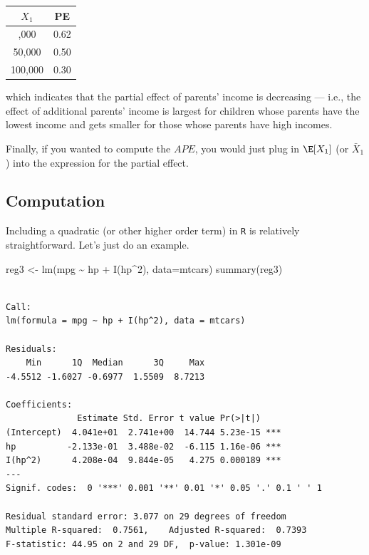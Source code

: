 \documentclass[
  letterpaper,
  DIV=11,
  numbers=noendperiod]{scrreprt}
\newenvironment{Shaded}{\begin{snugshade}}{\end{snugshade}}
\newcommand{\AttributeTok}[1]{\textcolor[rgb]{0.40,0.45,0.13}{#1}}
\newcommand{\DecValTok}[1]{\textcolor[rgb]{0.68,0.00,0.00}{#1}}
\newcommand{\FunctionTok}[1]{\textcolor[rgb]{0.28,0.35,0.67}{#1}}
\newcommand{\NormalTok}[1]{\textcolor[rgb]{0.00,0.23,0.31}{#1}}
\newcommand{\OtherTok}[1]{\textcolor[rgb]{0.00,0.23,0.31}{#1}}
\newcommand{\SpecialCharTok}[1]{\textcolor[rgb]{0.37,0.37,0.37}{#1}}
\begin{document}
\begin{longtable}[]{@{}cc@{}}
\toprule\noalign{}
\(X_1\) & PE \\
\midrule\noalign{}
\endhead
\bottomrule\noalign{}
\endlastfoot
20,000 & 0.62 \\
50,000 & 0.50 \\
100,000 & 0.30 \\
\end{longtable}

which indicates that the partial effect of parents' income is decreasing
--- i.e., the effect of additional parents' income is largest for
children whose parents have the lowest income and gets smaller for those
whose parents have high incomes.

Finally, if you wanted to compute the \(APE\), you would just plug in
\(\E[X_1]\) (or \(\bar{X}_1\)) into the expression for the partial
effect.

\subsection{Computation}\label{computation-3}

Including a quadratic (or other higher order term) in \texttt{R} is
relatively straightforward. Let's just do an example.

\begin{Shaded}
\begin{Highlighting}[]
\NormalTok{reg3 }\OtherTok{\textless{}{-}} \FunctionTok{lm}\NormalTok{(mpg }\SpecialCharTok{\textasciitilde{}}\NormalTok{ hp }\SpecialCharTok{+} \FunctionTok{I}\NormalTok{(hp}\SpecialCharTok{\^{}}\DecValTok{2}\NormalTok{), }\AttributeTok{data=}\NormalTok{mtcars)}
\FunctionTok{summary}\NormalTok{(reg3)}
\end{Highlighting}
\end{Shaded}

\begin{verbatim}

Call:
lm(formula = mpg ~ hp + I(hp^2), data = mtcars)

Residuals:
    Min      1Q  Median      3Q     Max 
-4.5512 -1.6027 -0.6977  1.5509  8.7213 

Coefficients:
              Estimate Std. Error t value Pr(>|t|)    
(Intercept)  4.041e+01  2.741e+00  14.744 5.23e-15 ***
hp          -2.133e-01  3.488e-02  -6.115 1.16e-06 ***
I(hp^2)      4.208e-04  9.844e-05   4.275 0.000189 ***
---
Signif. codes:  0 '***' 0.001 '**' 0.01 '*' 0.05 '.' 0.1 ' ' 1

Residual standard error: 3.077 on 29 degrees of freedom
Multiple R-squared:  0.7561,    Adjusted R-squared:  0.7393 
F-statistic: 44.95 on 2 and 29 DF,  p-value: 1.301e-09
\end{verbatim}
\end{document}
